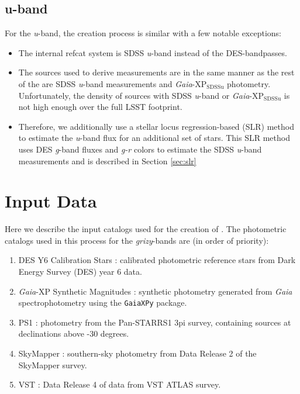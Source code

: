 \subsection{u-band}
For the \textit{u}-band, the creation process is similar with a few notable exceptions:
\begin{itemize}
    \item The internal refcat system is SDSS \textit{u}-band instead of the DES-bandpasses.
    \item The sources used to derive measurements are in the same manner as the rest of the \monster are SDSS \textit{u}-band measurements and \emph{Gaia}-$\mathrm{XP_{SDSSu}}$ photometry. 
    Unfortunately, the density of sources with SDSS \textit{u}-band or \emph{Gaia}-$\mathrm{XP_{SDSSu}}$ is not high enough over the full LSST footprint. 
    \item 
    Therefore, we additionally use a stellar locus regression-based (SLR) method to estimate the \textit{u}-band flux for an additional set of stars. 
    This SLR method uses DES \textit{g}-band fluxes and \textit{g-r} colors to estimate the SDSS \textit{u}-band measurements and is described in Section \ref{sec:slr}
\end{itemize}



\section{Input Data}
\label{sec:input}
Here we describe the input catalogs used for the creation of \monster. 
The photometric catalogs used in this process for the \emph{grizy}-bands are (in order of priority):
\begin{enumerate}
    \item DES Y6 Calibration Stars \citep[Section \ref{sec:des};][]{2023arXiv230501695R}: calibrated photometric reference stars from Dark Energy Survey (DES) year 6 data.
    \item \emph{Gaia}-XP Synthetic Magnitudes \citep[Section \ref{sec:gaiaxp}][]{2023A&A...674A..33G}: synthetic photometry generated from \emph{Gaia} spectrophotometry using the \texttt{GaiaXPy} package.
    \item PS1 \citep[Section \ref{sec:ps1};][]{2016arXiv161205560C}: photometry from the Pan-STARRS1 3pi survey, containing sources at declinations above -30 degrees.
    \item SkyMapper \citep[Section \ref{sec:skymapper};][]{2019PASA...36...33O}: southern-sky photometry from Data Release 2 of the SkyMapper survey.
    \item VST \citep[Section \ref{sec:vst};][]{2015MNRAS.451.4238S}: Data Release 4 of data from VST ATLAS survey.
\end{enumerate}

